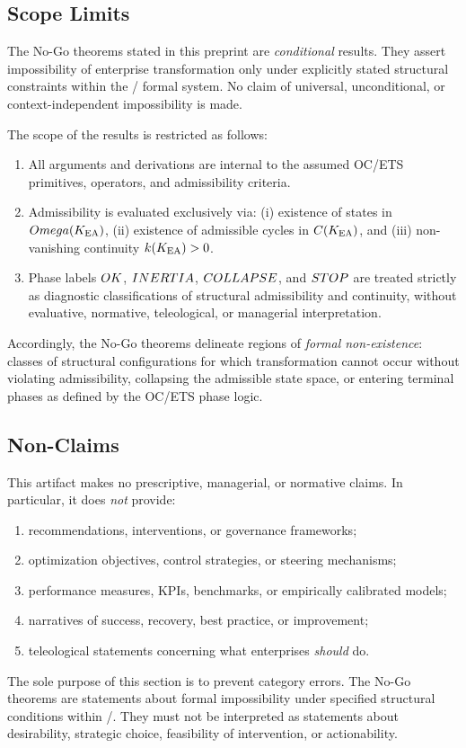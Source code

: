 ﻿%

\subsection*{Scope Limits}

The No-Go theorems stated in this preprint are \emph{conditional} results.
They assert impossibility of enterprise transformation only under explicitly
stated structural constraints within the \OC/ formal system.
No claim of universal, unconditional, or context-independent impossibility is
made.

The scope of the results is restricted as follows:
\begin{enumerate}
  \item All arguments and derivations are internal to the assumed OC/ETS
  primitives, operators, and admissibility criteria.
  \item Admissibility is evaluated exclusively via:
  (i) existence of states in $Omega(K_{\mathrm{EA}})$,
  (ii) existence of admissible cycles in $C(K_{\mathrm{EA}})$, and
  (iii) non-vanishing continuity $k(K_{\mathrm{EA}})>0$.
  \item Phase labels $OK$, $INERTIA$, $COLLAPSE$, and $STOP$ are treated strictly
  as diagnostic classifications of structural admissibility and continuity,
  without evaluative, normative, teleological, or managerial interpretation.
\end{enumerate}

Accordingly, the No-Go theorems delineate regions of \emph{formal non-existence}:
classes of structural configurations for which transformation cannot occur
without violating admissibility, collapsing the admissible state space, or
entering terminal phases as defined by the OC/ETS phase logic.

\subsection*{Non-Claims}

This artifact makes no prescriptive, managerial, or normative claims. In
particular, it does \emph{not} provide:
\begin{enumerate}
  \item recommendations, interventions, or governance frameworks;
  \item optimization objectives, control strategies, or steering mechanisms;
  \item performance measures, KPIs, benchmarks, or empirically calibrated models;
  \item narratives of success, recovery, best practice, or improvement;
  \item teleological statements concerning what enterprises \emph{should} do.
\end{enumerate}

The sole purpose of this section is to prevent category errors. The No-Go
theorems are statements about formal impossibility under specified structural
conditions within \OC/. They must not be interpreted as statements about
desirability, strategic choice, feasibility of intervention, or actionability.
